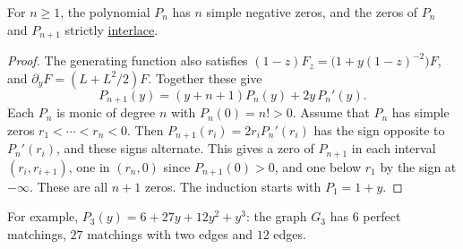 \begin{theorem}
For $n\geq1$, the polynomial $P_n$ has $n$ simple negative zeros, and the zeros
of $P_n$ and $P_{n+1}$ strictly \hyperref[interlacesPolynomial]{interlace}.
\end{theorem}

\begin{proof}
The generating function also satisfies
$(1-z)F_z=\big(1+y(1-z)^{-2}\big)F$, and $\partial_yF=(L+L^2/2)F$.
Together these give
\[
 P_{n+1}(y)=(y+n+1)P_n(y)+2y\,P_n'(y).
\]
Each $P_n$ is monic of degree $n$ with $P_n(0)=n!>0$.  Assume that $P_n$ has
simple zeros $r_1<\dotsb<r_n<0$.  Then $P_{n+1}(r_i)=2r_iP_n'(r_i)$ has the sign
opposite to $P_n'(r_i)$, and these signs alternate.  This gives a zero of
$P_{n+1}$ in each interval $(r_i,r_{i+1})$, one in $(r_n,0)$ since
$P_{n+1}(0)>0$, and one below $r_1$ by the sign at $-\infty$.  These are all
$n+1$ zeros.  The induction starts with $P_1=1+y$.
\end{proof}

For example, $P_3(y)=6+27y+12y^2+y^3$: the graph $G_3$ has $6$ perfect
matchings, $27$ matchings with two edges and $12$ edges.
